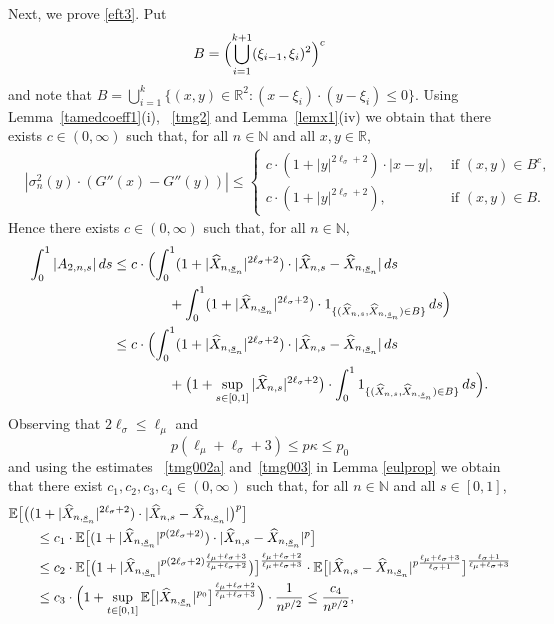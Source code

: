 \documentclass[11pt]{amsart}
\newcommand{\R}{{\mathbb R}}
\newcommand{\N}{{\mathbb N}}
\newcommand{\EE}{{\mathbb E}}
\newcommand{\eul}{{\widehat X}}
\newcommand{\usn}{\underline {s}_n}
\theoremstyle{plain}
\theoremstyle{definition}
\begin{document}
Next, we prove \eqref{eft3}.
Put
\[
B= \Bigl(\bigcup_{i=1}^{k+1} (\xi_{i-1}, \xi_{i})^2\Bigr)^c
\]
and note that
$B=\bigcup_{i=1}^k \{(x,y)\in\R^2:  (x-\xi_{i})\cdot(y-\xi_{i})\leq 0\}$.
Using Lemma~\ref{tamedcoeff1}(i), ~\eqref{tmg2} and Lemma~\ref{lemx1}(iv) we
obtain that there exists
$ c\in(0, \infty)$ such that, for all $n\in\N$ and all  $x,y\in\R$,
\begin{align*}
	&|\sigma_n^2(y)\cdot (G''(x)-G''(y))|\leq \begin{cases}
		c\cdot (1+|y|^{2\ell_\sigma+2})\cdot|x-y|, &\text{ if } (x,y)\in B^c, \\
		c\cdot (1+|y|^{2\ell_\sigma+2}),&\text{ if } (x,y)\in B.
	\end{cases}
\end{align*}
Hence there exists
$ c\in(0, \infty)$ such that, for all $n\in\N$,
\begin{equation}\label{end1}
	\begin{aligned}
	\int_0^1 |A_{2,n,s}|\, ds
		& \leq c\cdot \Bigl(\int_0^1(1+|\eul_{n,\usn}|^{2\ell_\sigma+2})\cdot |\eul_{n,s}-\eul_{n,\usn} |\, ds \\
		& \qquad\qquad +   \int_0^1(1+|\eul_{n,\usn}|^{2\ell_\sigma+2})\cdot 1_{\{(\eul_{n,s}, \eul_{n,\usn})\in B\}}\, ds\Bigr)\\
			& \leq c\cdot \Bigl(\int_0^1(1+|\eul_{n,\usn}|^{2\ell_\sigma+2})\cdot |\eul_{n,s}-\eul_{n,\usn} |\, ds \\
		& \qquad\qquad +  \bigl(1+\sup_{s\in [0,1]}|\eul_{n,s}|^{2\ell_\sigma+2}\bigr)\cdot  \int_0^11_{\{(\eul_{n,s}, \eul_{n,\usn})\in B\}}\, ds\Bigr).
	\end{aligned}
\end{equation}
Observing that $2\ell_\sigma\le \ell_\mu$ and
\[
 p(\ell_\mu + \ell_\sigma +3) \le p\kappa \le p_0
\]
 and using
the estimates ~\eqref{tmg002a} and~\eqref{tmg003} in Lemma \ref{eulprop}
we obtain that there exist $c_1,c_2, c_3, c_4\in (0,\infty)$ such that, for all $n\in\N$ and all $s\in[0,1]$,
\begin{align*}
 & \EE \bigl[\bigl((1+|\eul_{n,\usn}|^{2\ell_\sigma+2})\cdot |\eul_{n,s}-\eul_{n,\usn} |	\bigr)^p\bigr]\\	&\qquad  \le c_1\cdot \EE \bigl[(1+|\eul_{n,\usn}|^{p(2\ell_\sigma+2)})\cdot |\eul_{n,s}-\eul_{n,\usn} |^p\bigr] \\
 &\qquad  \le c_2\cdot \EE\bigl[\bigl(1+|\eul_{n,\usn}|^{p(2\ell_\sigma+2)\frac{\ell_\mu+\ell_\sigma+3}{\ell_\mu+\ell_\sigma+2}}\bigr)
 	\bigr]^{\frac{\ell_\mu+\ell_\sigma+2}{\ell_\mu+\ell_\sigma+3}}\cdot
 	 \EE \bigl[ |\eul_{n,s}-\eul_{n,\usn} |^{p\frac{\ell_\mu+\ell_\sigma+3}{\ell_\sigma+1}}\bigr]^{\frac{\ell_\sigma+1}{\ell_\mu+\ell_\sigma+3}}\\
 &\qquad  \le c_3\cdot \Bigl(1+\sup_{t\in[0,1]}\EE\bigl[|\eul_{n,\usn}|^{p_0}\bigr]^{\frac{\ell_\mu+\ell_\sigma+2}{\ell_\mu+\ell_\sigma+3}}\Bigr)\cdot \frac{1}{n^{p/2} } \le  \frac{c_4}{n^{p/2} },
\end{align*}
\end{document}
